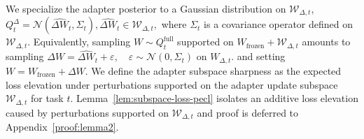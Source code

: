 \documentclass{article}
\theoremstyle{plain}
\theoremstyle{definition}
\theoremstyle{remark}
\begin{document}


We specialize the adapter posterior to a Gaussian distribution on $\mathcal W_{\Delta,t}$,
$
Q_t^\Delta = \mathcal N(\hat{\Delta W}_t,\Sigma_t),
\hat{\Delta W}_t \in \mathcal W_{\Delta,t},
$
where $\Sigma_t$ is a covariance operator defined on $\mathcal W_{\Delta,t}$.
Equivalently, sampling $W\sim Q_t^{\mathrm{full}}$ supported on $W_{\mathrm{frozen}}+\mathcal W_{\Delta,t}$ amounts to sampling
$\Delta W = \hat{\Delta W}_t + \varepsilon,
\quad
\varepsilon \sim \mathcal N(0,\Sigma_t) \text{ on } W_{\Delta,t}.$
and setting $W=W_{\mathrm{frozen}}+\Delta W$. We define the adapter subspace sharpness as the expected loss elevation under perturbations supported on the adapter update subspace $\mathcal W_{\Delta,t}$ for task $t$.  Lemma~\ref{lem:subspace-loss-pecl} isolates an additive loss elevation caused by perturbations supported on $\mathcal W_{\Delta,t}$ and proof is deferred to Appendix~\ref{proof:lemma2}.
\end{document}
